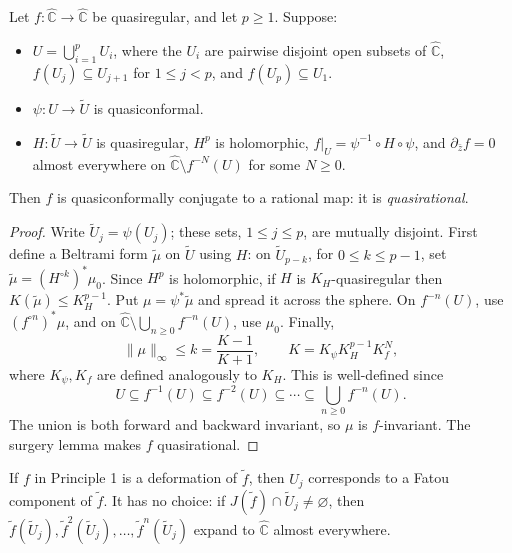 \documentclass[11pt,a4paper]{article}
\begin{document}
\setcounter{theorem}{48}\begin{theorem}\label{thm:cd12-domain-principle}
Let \(f:\widehat{\mathbb C}\to\widehat{\mathbb C}\) be quasiregular, and let \(p\ge1\). Suppose:
\begin{itemize}
\item \(U=\bigcup_{i=1}^pU_i\), where the \(U_i\) are pairwise disjoint open subsets of \(\widehat{\mathbb C}\), \(f(U_j)\subseteq U_{j+1}\) for \(1\le j<p\), and \(f(U_p)\subseteq U_1\).
\item \(\psi:U\to\widetilde U\) is quasiconformal.
\item \(H:\widetilde U\to\widetilde U\) is quasiregular, \(H^p\) is holomorphic, \(f|_U=\psi^{-1}\circ H\circ\psi\), and
\(\partial_{\bar z}f=0\) almost everywhere on \(\widehat{\mathbb C}\setminus f^{-N}(U)\) for some \(N\ge0\).
\end{itemize}
Then \(f\) is quasiconformally conjugate to a rational map: it is \emph{quasirational}.
\end{theorem}
\begin{proof}
Write \(\widetilde U_j=\psi(U_j)\); these sets, \(1\le j\le p\), are mutually disjoint. First define a Beltrami form \(\widetilde\mu\) on \(\widetilde U\) using \(H\): on \(\widetilde U_{p-k}\), for \(0\le k\le p-1\), set
\(\widetilde\mu=(H^{\circ k})^*\mu_0\). Since \(H^p\) is holomorphic, if \(H\) is \(K_H\)-quasiregular then
\(K(\widetilde\mu)\le K_H^{p-1}\).
Put \(\mu=\psi^*\widetilde\mu\) and spread it across the sphere. On \(f^{-n}(U)\), use \((f^{\circ n})^*\mu\), and on
\(\widehat{\mathbb C}\setminus\bigcup_{n\ge0}f^{-n}(U)\), use \(\mu_0\). Finally,
\[
\|\mu\|_\infty\le k=\frac{K-1}{K+1},
\qquad K=K_\psi K_H^{p-1}K_f^N,
\]
where \(K_\psi,K_f\) are defined analogously to \(K_H\).
This is well-defined since
\[
U\subseteq f^{-1}(U)\subseteq f^{-2}(U)\subseteq\cdots
\subseteq\bigcup_{n\ge0}f^{-n}(U).
\]
The union is both forward and backward invariant, so \(\mu\) is \(f\)-invariant. The surgery lemma makes \(f\) quasirational.
\end{proof}
\begin{remark}
If \(f\) in Principle 1 is a deformation of \(\widetilde f\), then \(U_j\) corresponds to a Fatou component of \(\widetilde f\). It has no choice: if
\(J(\widetilde f)\cap\widetilde U_j\ne\varnothing\), then
\(\widetilde f(\widetilde U_j),\widetilde f^2(\widetilde U_j),\ldots,\widetilde f^n(\widetilde U_j)\) expand to \(\widehat{\mathbb C}\) almost everywhere.
\end{remark}
\end{document}
